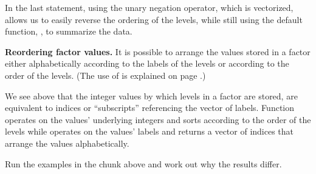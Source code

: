 \documentclass[krantz2]{krantz}\usepackage{knitr}
\begin{document}
\begin{explainbox}
In the last statement, using the unary negation operator, which is vectorized, allows us to easily reverse the ordering of the levels, while still using the default function, , to summarize the data.

\end{explainbox}

\begin{advplayground}\label{calc:ADVPG:order:sort}
\textbf{Reordering factor values.} It is possible to arrange the values stored in a factor either alphabetically according to the labels of the levels or according to the order of the levels. (The use of  is explained on page \pageref{pg:seq:rep}.)

\begin{knitrout}\footnotesize
{}\color{fgcolor}\begin{kframe}
\begin{alltt}
 \hlkwb{<-} \hlstd{(}\hlstd{,} \hlstd{,}  \hlstd{=} \hlstd{(}\hlstd{,} \hlstd{,} \hlstd{,} \hlstd{))}
 \hlkwb{<-} \hlstd{(}\hlstd{(}\hlstd{(}\hlstd{,} \hlstd{,} \hlstd{,} \hlstd{),} \hlstd{(}\hlstd{,}\hlstd{)))}
\hlstd{(my.factor5)[}\hlstd{(my.factor5)]}
\end{alltt}
\end{kframe}
\end{knitrout}

We see above that the integer values by which levels in a factor are stored, are equivalent to indices or ``subscripts'' referencing the vector of labels. Function  operates on the values' underlying integers and sorts according to the order of the levels while  operates on the values' labels and returns a vector of indices that arrange the values alphabetically.

\begin{knitrout}\footnotesize
{}\color{fgcolor}\begin{kframe}
\begin{alltt}
\hlstd{my.factor4[}\hlstd{(my.factor4)]}
\hlstd{my.factor4[}\hlstd{(}\hlstd{(my.factor4))]}
\end{alltt}
\end{kframe}
\end{knitrout}

Run the examples in the chunk above and work out why the results differ.
\end{advplayground}
\end{document}
